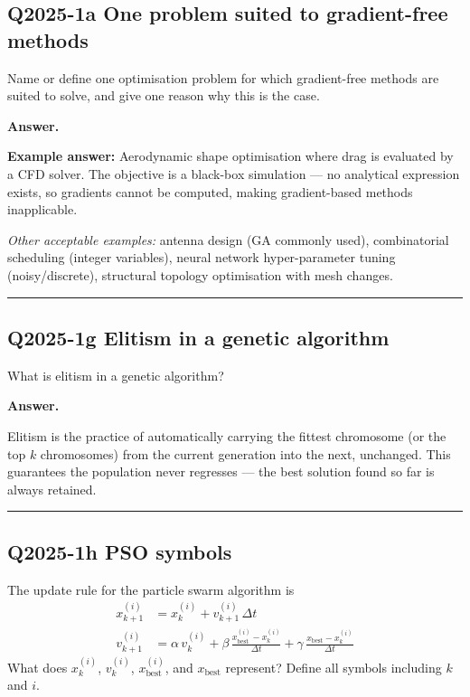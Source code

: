 \documentclass[11pt,a4paper]{article}
\newcommand{\Q}[2]{\subsection*{Q#1 \quad #2}}
\newenvironment{answer}{\medskip\textbf{Answer.}\par}{\bigskip\hrule\bigskip}
\begin{document}

\Q{2025-1a}{[2 marks] One problem suited to gradient-free methods}
Name or define one optimisation problem for which gradient-free methods
are suited to solve, and give one reason why this is the case.

\begin{answer}
\textbf{Example answer:}
Aerodynamic shape optimisation where drag is evaluated by a CFD solver.
The objective is a black-box simulation — no analytical expression exists,
so gradients cannot be computed, making gradient-based methods inapplicable.

\medskip
\textit{Other acceptable examples:} antenna design (GA commonly used),
combinatorial scheduling (integer variables), neural network hyper-parameter
tuning (noisy/discrete), structural topology optimisation with mesh changes.
\end{answer}


\Q{2025-1g}{[1 mark] Elitism in a genetic algorithm}
What is elitism in a genetic algorithm?

\begin{answer}
Elitism is the practice of automatically carrying the fittest chromosome
(or the top $k$ chromosomes) from the current generation into the next,
unchanged.  This guarantees the population never regresses — the best
solution found so far is always retained.
\end{answer}


\Q{2025-1h}{[3 marks] PSO symbols}
The update rule for the particle swarm algorithm is
\begin{align*}
  x^{(i)}_{k+1} &= x^{(i)}_k + v^{(i)}_{k+1}\,\Delta t \\
  v^{(i)}_{k+1} &= \alpha\, v^{(i)}_k
    + \beta\,\frac{x^{(i)}_\text{best} - x^{(i)}_k}{\Delta t}
    + \gamma\,\frac{x_\text{best} - x^{(i)}_k}{\Delta t}
\end{align*}
What does $x^{(i)}_k$, $v^{(i)}_k$, $x^{(i)}_\text{best}$, and
$x_\text{best}$ represent?  Define all symbols including $k$ and $i$.
\end{document}
